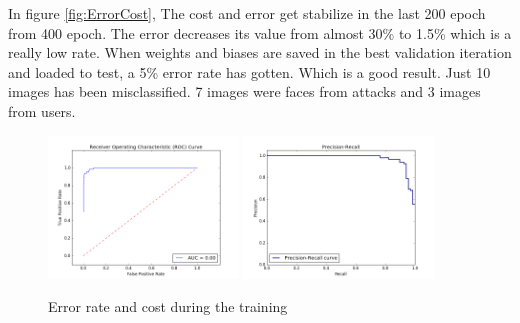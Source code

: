 \documentclass[a4paper]{article}
\begin{document}
In figure \ref{fig:ErrorCost}, The cost and error get stabilize in the last 200 epoch from 400 epoch. The error decreases its value from almost 30\% to 1.5\% which is a really low rate. When weights and biases are saved in the best validation iteration and loaded to test, a 5\% error rate has gotten. Which is a good result. Just 10 images has been misclassified. 7 images were faces from attacks and 3 images from users.

\begin{figure}[htb]
\centering
\includegraphics[width=0.45\textwidth]{images/ROC.png}
\includegraphics[width=0.45\textwidth]{images/Precision-Recall.png}

\caption{Error rate and cost during the training} \label{fig:ROCPrecisionRecall}
\end{figure}
\end{document}
